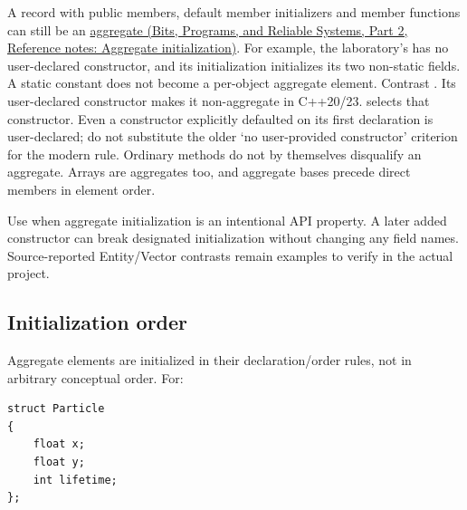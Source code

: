 A record with public members, default member initializers and member functions can still be an \href{../01-Bits-Programs-and-Reliable-Systems-P02/main.pdf\#nameddest=appendix-b7174c179542}{aggregate (Bits, Programs, and Reliable Systems, Part 2, Reference notes: Aggregate initialization)}. For example, the laboratory's  has no user-declared constructor, and its  initialization initializes its two non-static fields. A static constant does not become a per-object aggregate element. Contrast . Its user-declared constructor makes it non-aggregate in C++20/23.  selects that constructor. Even a constructor explicitly defaulted on its first declaration is user-declared; do not substitute the older `no user-provided constructor' criterion for the modern rule. Ordinary methods do not by themselves disqualify an aggregate. Arrays are aggregates too, and aggregate bases precede direct members in element order.

Use  when aggregate initialization is an intentional API property. A later added constructor can break designated initialization without changing any field names. Source-reported Entity/Vector contrasts remain examples to verify in the actual project.

\subsection{Initialization order}\label{05-engine-i-ch003-initialization-order}

\hypertarget{05-engine-i-ch003-initialization-order}{}

Aggregate elements are initialized in their declaration/order rules, not in arbitrary conceptual order. For:

\begin{verbatim}
struct Particle
{
    float x;
    float y;
    int lifetime;
};
\end{verbatim}


